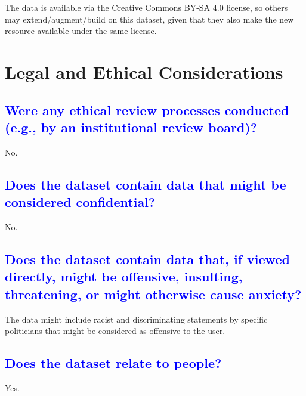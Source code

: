 \documentclass[letterpaper, 10 pt, conference]{ieeeconf}  %
\begin{document}

The data is available via the Creative Commons BY-SA 4.0 license, so others may extend/augment/build on this dataset, given that they also make the new resource available under the same license.


\pagebreak  


\section{Legal and Ethical Considerations}

\textcolor{blue}{\subsection{Were any ethical review processes conducted (e.g., by an institutional review board)?}} %

No.

\textcolor{blue}{\subsection{Does the dataset contain data that might be considered confidential?}}

No.

\textcolor{blue}{\subsection{Does the dataset contain data that, if viewed directly, might be offensive, insulting, threatening, or might otherwise cause anxiety?}} %

The data might include racist and discriminating statements by specific politicians that might be considered as offensive to the user.



\textcolor{blue}{\subsection{Does the dataset relate to people?}} %

Yes.
\end{document}
